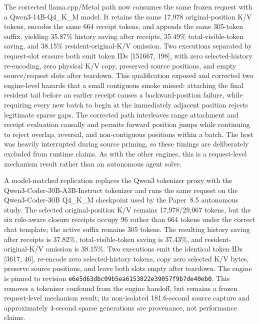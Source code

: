 \documentclass[11pt]{article}
\begin{document}
The corrected llama.cpp/Metal path now consumes the same frozen request with a
Qwen3-14B-Q4\_K\_M model.  It retains the same 17,978 original-position K/V
tokens, encodes the same 664 receipt tokens, and appends the same 305-token
suffix, yielding 35.87\% history saving after receipts, 35.49\%
total-visible-token saving, and 38.15\% resident-original-K/V omission.  Two
executions separated by request-slot erasure both emit token IDs
[151667, 198], with zero selected-history re-encoding, zero physical K/V copy,
preserved source positions, and empty source/request slots after teardown.
This qualification exposed and corrected two engine-level hazards that a
small contiguous smoke missed: attaching the final resident tail before an
earlier receipt causes a backward-position failure, while requiring every new
batch to begin at the immediately adjacent position rejects legitimate sparse
gaps.  The corrected path interleaves range attachment and receipt evaluation
causally and permits forward position jumps while continuing to reject
overlap, reversal, and non-contiguous positions within a batch.  The host was
heavily interrupted during source priming, so these timings are deliberately
excluded from runtime claims.  As with the other engines, this is a
request-level mechanism result rather than an autonomous agent solve.

A model-matched replication replaces the Qwen3 tokenizer proxy with the
Qwen3-Coder-30B-A3B-Instruct tokenizer and runs the same request on the
Qwen3-Coder-30B Q4\_K\_M checkpoint used by the Paper~8.5 autonomous study.
The selected original-position K/V remains 17,978/29,067 tokens, but the six
role-aware closure receipts occupy 96 rather than 664 tokens under the correct
chat template; the active suffix remains 305 tokens.  The resulting history
saving after receipts is 37.82\%, total-visible-token saving is 37.43\%, and
resident-original-K/V omission is 38.15\%.  Two executions emit the identical
token IDs [3617, 46], re-encode zero selected-history tokens, copy zero
selected K/V bytes, preserve source positions, and leave both slots empty
after teardown.  The engine is pinned to revision
\texttt{e6e5d63dbc09b5ea6153822e39057f9b7de40eb0}.  This removes a tokenizer
confound from the engine handoff, but remains a frozen request-level mechanism
result; its non-isolated 181.6-second source capture and approximately
4-second sparse generations are provenance, not performance claims.
\end{document}
